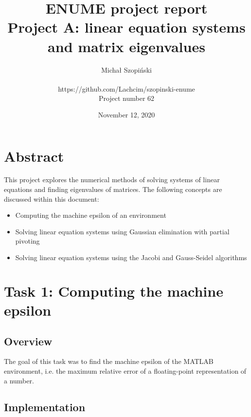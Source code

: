 \documentclass{article}
\begin{document}
	\title{ENUME project report\\Project A: linear equation systems\\and matrix
	eigenvalues}
	\author{Michał Szopiński\\\\
	https://github.com/Lachcim/szopinski-enume\\
	Project number 62}
	\date{November 12, 2020}
	\maketitle
	
	
	\setcounter{section}{-1}
	\section{Abstract}
	
	This project explores the numerical methods of solving systems of linear
	equations and finding eigenvalues of matrices. The following concepts are
	discussed within this document:
	
	\begin{itemize}
		\item Computing the machine epsilon of an environment
		\item Solving linear equation systems using Gaussian elimination with
		partial pivoting
		\item Solving linear equation systems using the Jacobi and Gauss-Seidel
		algorithms
	\end{itemize}
	
	\newpage
	
	\section{Task 1: Computing the machine epsilon}
	
	\subsection{Overview}
	
	The goal of this task was to find the machine epsilon of the MATLAB
	environment, i.e. the maximum relative error of a floating-point
	representation of a number.
	
	\subsection{Implementation}
	
\end{document}
